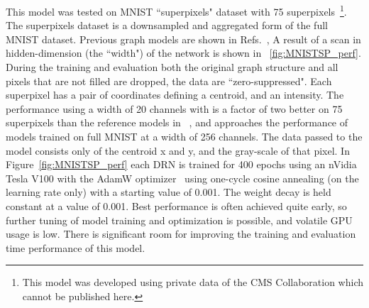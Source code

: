 \documentclass{article}
\begin{document}
This model was tested on MNIST ``superpixels" dataset with 75 superpixels~\footnote{This model was developed using private data of the CMS Collaboration which cannot be published here.}.
The superpixels dataset is a downsampled and aggregated form of the full MNIST dataset.
Previous graph models are shown in Refs.~\cite{monti2016geometric, fey2017splinecnn}, 
A result of a scan in hidden-dimension (the ``width") of the network is shown in ~\ref{fig:MNISTSP_perf}. 
During the training and evaluation both the original graph structure and all pixels that are not filled are dropped, the data are ``zero-suppressed".
Each superpixel has a pair of coordinates defining a centroid, and an intensity.
The performance using a width of 20 channels with  is a factor of two better on 75 superpixels than the reference models in ~\cite{monti2016geometric, fey2017splinecnn}, and approaches the performance of models trained on full MNIST at a width of 256 channels.
The data passed to the model consists only of the centroid x and y, and the gray-scale of that pixel. 
In Figure~\ref{fig:MNISTSP_perf} each DRN is trained for 400 epochs using an nVidia Tesla V100 with the AdamW optimizer~\cite{loshchilov2017decoupled} using one-cycle cosine annealing (on the learning rate only) with a starting value of 0.001.
The weight decay is held constant at a value of 0.001.
Best performance is often achieved quite early, so further tuning of model training and optimization is possible, and volatile GPU usage is low.
There is significant room for improving the training and evaluation time performance of this model.
\end{document}
